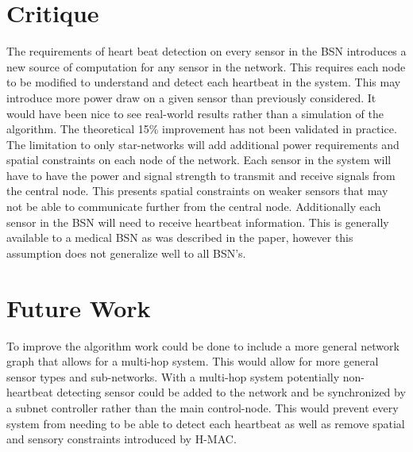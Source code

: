 \documentclass{article}
\begin{document}
\section*{Critique}
The requirements of heart beat detection on every sensor in the BSN introduces a new source of computation for any sensor in the network. This requires each node to be modified to understand and detect each heartbeat in the system. This may introduce more power draw on a given sensor than previously considered. It would have been nice to see real-world results rather than a simulation of the algorithm. The theoretical 15\% improvement has not been validated in practice. The limitation to only star-networks will add additional power requirements and spatial constraints on each node of the network. Each sensor in the system will have to have the power and signal strength to transmit and receive signals from the central node. This presents spatial constraints on weaker sensors that may not be able to communicate further from the central node. Additionally each sensor in the BSN will need to receive heartbeat information. This is generally available to a medical BSN as was described in the paper, however this assumption does not generalize well to all BSN's.
\section*{Future Work}
To improve the algorithm work could be done to include a more general network graph that allows for a multi-hop system. This would allow for more general sensor types and sub-networks. With a multi-hop system potentially non-heartbeat detecting sensor could be added to the network and be synchronized by a subnet controller rather than the main control-node. This would prevent every system from needing to be able to detect each heartbeat as well as remove spatial and sensory constraints introduced by H-MAC.
\cite{5229313}
\end{document}
